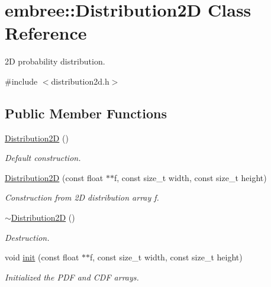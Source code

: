 \hypertarget{classembree_1_1_distribution2_d}{
\section{embree::Distribution2D Class Reference}
\label{classembree_1_1_distribution2_d}
}


2D probability distribution.  




{\ttfamily \#include $<$distribution2d.h$>$}

\subsection*{Public Member Functions}
\begin{DoxyCompactItemize}
\item 
\hyperlink{classembree_1_1_distribution2_d_ac430c301c5f1ad80173e0cfff67be22f}{Distribution2D} ()
\begin{DoxyCompactList}\small\item\em Default construction. \item\end{DoxyCompactList}\item 
\hyperlink{classembree_1_1_distribution2_d_ab67b542f7d81dd42db250ed6f54d8792}{Distribution2D} (const float $\ast$$\ast$f, const size\_\-t width, const size\_\-t height)
\begin{DoxyCompactList}\small\item\em Construction from 2D distribution array f. \item\end{DoxyCompactList}\item 
\hyperlink{classembree_1_1_distribution2_d_a982b5f1cd4e4ef6ef25fa484b960f926}{$\sim$Distribution2D} ()
\begin{DoxyCompactList}\small\item\em Destruction. \item\end{DoxyCompactList}\item 
void \hyperlink{classembree_1_1_distribution2_d_a4ce39b16aea3da7ecc4e0aaeec9c802c}{init} (const float $\ast$$\ast$f, const size\_\-t width, const size\_\-t height)
\begin{DoxyCompactList}\small\item\em Initialized the PDF and CDF arrays. \item\end{DoxyCompactList}\item 

\end{DoxyCompactItemize}
